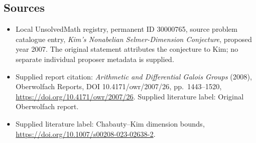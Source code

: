 \documentclass[11pt]{article}
\begin{document}
\subsection{Sources}
\begin{itemize}\item Local UnsolvedMath registry, permanent ID 30000765, source problem catalogue entry, \emph{Kim's Nonabelian Selmer-Dimension Conjecture}, proposed year 2007. The original statement attributes the conjecture to Kim; no separate individual proposer metadata is supplied.\item Supplied report citation: \emph{Arithmetic and Differential Galois Groups} (2008), Oberwolfach Reports, DOI 10.4171/owr/2007/26, pp.\ 1443--1520, \url{https://doi.org/10.4171/owr/2007/26}. Supplied literature label: Original Oberwolfach report.\item Supplied literature label: Chabauty--Kim dimension bounds, \url{https://doi.org/10.1007/s00208-023-02638-2}.\end{itemize}
\end{document}
